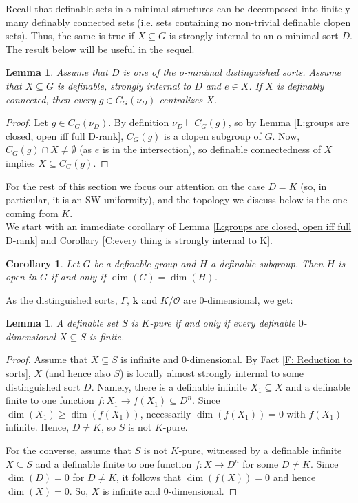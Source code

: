 \documentclass[11pt]{amsart}
\newtheorem{corollary}[theorem]{Corollary}
\newtheorem{lemma}[theorem]{Lemma}
\theoremstyle{definition}
\newcommand{\bk}{\textbf{k}}
\newcommand{\CO}{{\mathcal O}}
\newcommand{\0}{\emptyset}
\def\sub{\subseteq}
\begin{document}
 Recall that definable sets in o-minimal structures can be decomposed into finitely many definably  connected sets (i.e. sets containing no non-trivial definable clopen sets). Thus, the same is true if $X\sub G$ is strongly internal to an o-minimal sort $D$.
The result below will be useful in the sequel.
\begin{lemma}\label{L:def connected}
 Assume that $D$ is one of the o-minimal distinguished sorts.   Assume that $X\subseteq G$ is definable,  strongly internal to $D$ and $e\in X$. If $X$ is  definably connected, then every $g\in C_G(\nu_D)$ centralizes $X$.
\end{lemma}
\begin{proof}
    Let $g\in C_G(\nu_D)$.  By definition $\nu_D\vdash C_G(g)$, so by Lemma \ref{L:groups are closed, open iff full D-rank}, $C_G(g)$ is a clopen subgroup of $G$. Now, $C_G(g)\cap X\neq \0$ (as $e$ is in the intersection), so definable connectedness of $X$ implies $X\subseteq C_G(g)$.
\end{proof}


 For the rest of this section  we focus our attention on the case $D=K$ (so, in particular, it is an SW-uniformity),  and the topology we discuss below is the one coming from $K$. \\

We start with an immediate  corollary of Lemma \ref{L:groups are closed, open iff full D-rank} and Corollary \ref{C:every thing is strongly internal to K}.
\begin{corollary}\label{C: open iff full dim}
    Let $G$ be a definable group and $H$ a definable subgroup. Then $H$ is open in $G$ if and only if $\dim(G)=\dim(H)$.
\end{corollary}


As the distinguished sorts,  $\Gamma$, $\bk$ and $K/\CO$ are $0$-dimensional, we get:

\begin{lemma}\label{l: pure 0dim}
    A definable set $S$ is $K$-pure if and only if every definable $0$-dimensional  $X\sub S$ is finite. 
\end{lemma}
\begin{proof} 
    Assume that  $X\sub S$ is infinite and $0$-dimensional. By Fact \ref{F: Reduction to sorts},
    $X$ (and hence also $S$) is locally almost strongly internal to some distinguished sort $D$. Namely, there is a definable infinite $X_1\sub X$ and a definable finite to one function $f:X_1\to f(X_1)\sub D^n$.  Since $\dim(X_1)\ge \dim (f(X_1))$,  necessarily $\dim (f(X_1))=0$ with $f(X_1)$ infinite. Hence,  $D\neq K$, so $S$ is not $K$-pure. 
    
    For the converse, assume that $S$ is not $K$-pure, witnessed by a definable infinite $X\sub S$ and a definable finite to one function  $f:X\to D^n$ for some $D\neq K$.  Since $\dim(D)=0$ for  $D\neq K$,  it follows that  $\dim(f(X))=0$ and hence $\dim(X)=0$.   So, $X$ is infinite and $0$-dimensional.
\end{proof}
\end{document}
